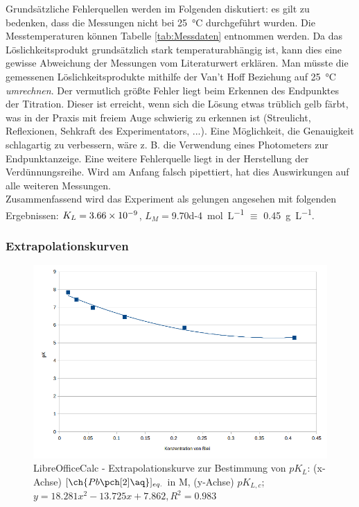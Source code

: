 \documentclass{article}
\begin{document}
    Grundsätzliche Fehlerquellen werden im Folgenden diskutiert: es gilt zu bedenken, dass die Messungen nicht bei \SI[mode=text]{25}{\degreeCelsius} durchgeführt wurden. Die Messtemperaturen können Tabelle \ref{tab:Messdaten} entnommen werden. Da das Löslichkeitsprodukt grundsätzlich stark temperaturabhängig ist, kann dies eine gewisse Abweichung der Messungen vom Literaturwert erklären. Man müsste die gemessenen Löslichkeitsprodukte mithilfe der Van't Hoff Beziehung auf \SI[mode=text]{25}{\degreeCelsius} \textit{umrechnen}. Der vermutlich größte Fehler liegt beim Erkennen des Endpunktes der Titration. Dieser ist erreicht, wenn sich die Lösung etwas trüblich gelb färbt, was in der Praxis mit freiem Auge schwierig zu erkennen ist (Streulicht, Reflexionen, Sehkraft des Experimentators, ...). Eine Möglichkeit, die Genauigkeit schlagartig zu verbessern, wäre z. B. die Verwendung eines Photometers zur Endpunktanzeige. Eine weitere Fehlerquelle liegt in der Herstellung der Verdünnungsreihe. Wird am Anfang falsch pipettiert, hat dies Auswirkungen auf alle weiteren Messungen.\\
    
    Zusammenfassend wird das Experiment als gelungen angesehen mit folgenden Ergebnissen: $K_{L}=\num{3.66d-9}$, $L_{M} = $\SI[mode=text, separate-uncertainty]{9.70d-4}{\mole\per\liter} $\equiv$ \SI[mode=text, separate-uncertainty]{0.45}{\gram\per\liter}. 
    
    \subsubsection{Extrapolationskurven}
    
    \begin{figure}[H]
      \includegraphics[scale=0.6, center]{Graphiken/Auswertung/Extrapolation.png} 
      \caption[Extrapolationskurve zur Bestimmung von $pK_{L}$ mit LibreOfficeCalc, Quelle: Autor]{LibreOfficeCalc - Extrapolationskurve zur Bestimmung von $pK_{L}$: (x-Achse) $[\ch{Pb\pch[2]\aq}]_{eq.}$ in M, (y-Achse) $pK_{L,c}$; $y=18.281x^2-13.725x+7.862,R^2=0.983$}
      \label{fig:Extrapolation}
    \end{figure}
    
\end{document}
